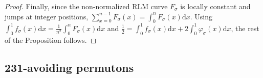 \documentclass[a4paper,11pt]{amsart}
\DeclareMathOperator{\noninv}{noninv}
\theoremstyle{definition}
\begin{document}
\begin{proof}
%
%

    Finally, since the non-normalized RLM curve $F_\sigma$ is locally constant and jumps at integer positions,  
    $\sum_{x=0}^{n-1} F_\sigma(x)=\int_0^n F_\sigma(x) \mathrm{d}x$.
    Using $\int_0^1 f_\sigma(x) \mathrm{d}x = \frac{1}{n^2} \int_0^n F_\sigma(x) \mathrm{d}x$ and $\frac12 = \int_0^1 f_\sigma(x) \mathrm{d}x + 2\int_0^1 \varphi_\sigma(x) \mathrm{d}x$, the rest of the Proposition follows.
\end{proof}


\subsection{231-avoiding permutons}
\end{document}
